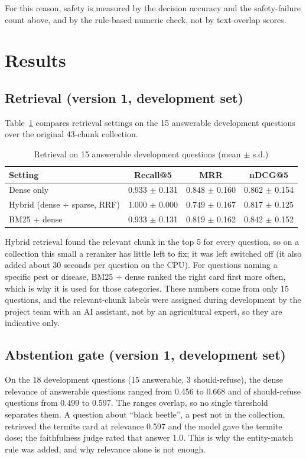 For this reason, safety is measured by the decision accuracy and the safety-failure count
above, and by the rule-based numeric check, not by text-overlap scores.

\section{Results}

\subsection{Retrieval (version 1, development set)}
Table~\ref{tab:retrieval} compares retrieval settings on the 15 answerable development
questions over the original 43-chunk collection.

\begin{table}[h]
\centering
\caption{Retrieval on 15 answerable development questions (mean $\pm$ s.d.)}
\label{tab:retrieval}
\begin{tabular}{lccc}
\toprule
Setting & Recall@5 & MRR & nDCG@5\\
\midrule
Dense only & 0.933 $\pm$ 0.131 & 0.848 $\pm$ 0.160 & 0.862 $\pm$ 0.154\\
Hybrid (dense + sparse, RRF) & 1.000 $\pm$ 0.000 & 0.749 $\pm$ 0.167 & 0.817 $\pm$ 0.125\\
BM25 + dense & 0.933 $\pm$ 0.131 & 0.819 $\pm$ 0.162 & 0.842 $\pm$ 0.152\\
\bottomrule
\end{tabular}
\end{table}

Hybrid retrieval found the relevant chunk in the top 5 for every question, so on a
collection this small a reranker has little left to fix; it was left switched off (it
also added about 30 seconds per question on the CPU). For questions naming a specific pest
or disease, BM25 + dense ranked the right card first more often, which is why it is used
for those categories. These numbers come from only 15 questions, and the relevant-chunk
labels were assigned during development by the project team with an AI assistant, not by
an agricultural expert, so they are indicative only.

\subsection{Abstention gate (version 1, development set)}
On the 18 development questions (15 answerable, 3 should-refuse), the dense relevance of
answerable questions ranged from 0.456 to 0.668 and of should-refuse questions from 0.499
to 0.597. The ranges overlap, so no single threshold separates them. A question about
``black beetle'', a pest not in the collection, retrieved the termite card at relevance
0.597 and the model gave the termite dose; the faithfulness judge rated that answer 1.0.
This is why the entity-match rule was added, and why relevance alone is not enough.

